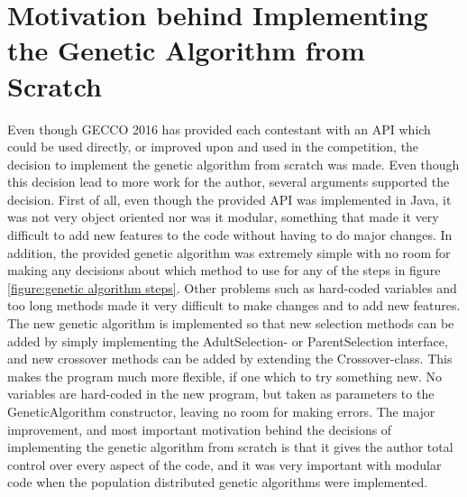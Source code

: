 \section{Motivation behind Implementing the Genetic Algorithm from Scratch}\label{section:motivation}
Even though GECCO	 2016 has provided each contestant with an API which could be used directly, or improved upon and used in the competition, the decision to implement the genetic algorithm from scratch was made. Even though this decision lead to more work for the author, several arguments supported the decision. First of all, even though the provided API was implemented in Java, it was not very object oriented nor was it modular, something that made it very difficult to add new features to the code without having to do major changes. In addition, the provided genetic algorithm was extremely simple with no room for making any decisions about which method to use for any of the steps in figure \ref{figure:genetic algorithm steps}. Other problems such as hard-coded variables and too long methods made it very difficult to make changes and to add new features. \\

The new genetic algorithm is implemented so that new selection methods can be added by simply implementing the AdultSelection- or ParentSelection interface, and new crossover methods can be added by extending the Crossover-class. This makes the program much more flexible, if one which to try something new. No variables are hard-coded in the new program, but taken as parameters to the GeneticAlgorithm constructor, leaving no room for making errors. The major improvement, and most important motivation behind the decisions of implementing the genetic algorithm from scratch is that it gives the author total control over every aspect of the code, and it was very important with modular code when the population distributed genetic algorithms were implemented.